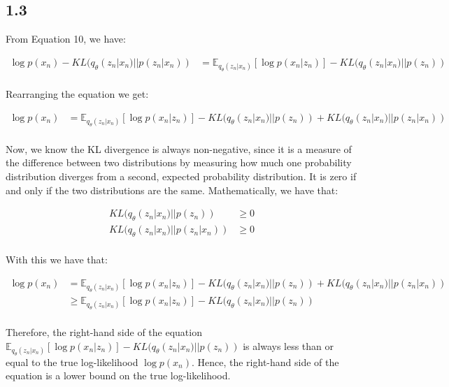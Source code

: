 \documentclass{article}
\begin{document}
\subsection*{1.3}

From Equation 10, we have:

\begin{align*}
    \log p(x_n) - KL(q_{\theta}(z_n|x_n) || p(z_n|x_n)) &= \mathbb{E}_{q_{\theta}(z_n|x_n)}[\log p(x_n|z_n)] - KL(q_{\theta}(z_n|x_n) || p(z_n)) \\
\end{align*}

Rearranging the equation we get: 

\begin{align*}
    \log p(x_n) &= \mathbb{E}_{q_{\theta}(z_n|x_n)}[\log p(x_n|z_n)] - KL(q_{\theta}(z_n|x_n) || p(z_n)) + KL(q_{\theta}(z_n|x_n) || p(z_n|x_n)) \\
\end{align*}

Now, we know the KL divergence is always non-negative, since it is a measure of the difference between two distributions by
measuring how much one probability distribution diverges from a second, expected probability distribution. It is zero if and only if the two distributions are the same.
Mathematically, we have that: 

\begin{align*}
    KL(q_{\theta}(z_n|x_n) || p(z_n)) &\geq 0 \\
    KL(q_{\theta}(z_n|x_n) || p(z_n|x_n)) &\geq 0 \\
\end{align*}

With this we have that: 

\begin{align*}
  \log p(x_n) &= \mathbb{E}_{q_{\theta}(z_n|x_n)}[\log p(x_n|z_n)] - KL(q_{\theta}(z_n|x_n) || p(z_n)) + KL(q_{\theta}(z_n|x_n) || p(z_n|x_n)) \\
  &\geq \mathbb{E}_{q_{\theta}(z_n|x_n)}[\log p(x_n|z_n)] - KL(q_{\theta}(z_n|x_n) || p(z_n)) \\
\end{align*}

Therefore, the right-hand side of the equation $\mathbb{E}_{q_{\theta}(z_n|x_n)}[\log p(x_n|z_n)] - KL(q_{\theta}(z_n|x_n) || p(z_n))$ is
always less than or equal to the true log-likelihood $\log p(x_n)$. Hence, the right-hand side of the equation is a lower bound on the true log-likelihood.
\end{document}
